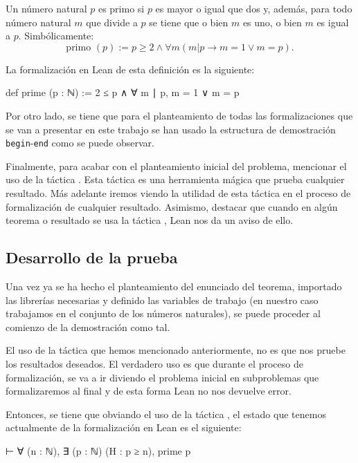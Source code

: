 \begin{definicion}
  Un número natural \(p\) es primo si \(p\) es mayor o igual que dos y,
  además, para todo número natural \(m\) que divide a \(p\) se tiene
  que o bien \(m\) es uno, o bien \(m\) es igual a \(p\).
  Simbólicamente:
  \begin{equation*}
    \text{primo }(p) := p ≥ 2 ∧ ∀ m (m | p → m = 1 ∨ m = p).
  \end{equation*}
\end{definicion}

La formalización en Lean de esta definición es la siguiente:
\begin{leancode}
def prime (p : ℕ) := 2 ≤ p ∧ ∀ m ∣ p, m = 1 ∨ m = p
\end{leancode}

Por otro lado, se tiene que para el planteamiento de todas las
formalizaciones que se van a presentar en este trabajo se han usado la
estructura de demostración \texttt{begin}-\texttt{end} como se puede
observar.

Finalmente, para acabar con el planteamiento inicial del problema,
mencionar el uso de la táctica . Esta táctica es
una herramienta mágica que prueba cualquier resultado. Más adelante
iremos viendo la utilidad de esta táctica en el proceso de formalización
de cualquier resultado.  Asimismo, destacar que cuando en algún teorema
o resultado se usa la táctica , Lean nos da un
aviso de ello.

\subsection{Desarrollo de la prueba}

Una vez ya se ha hecho el planteamiento del enunciado del teorema,
importado las librerías necesarias y definido las variables de trabajo
(en nuestro caso trabajamos en el conjunto de los números naturales), se
puede proceder al comienzo de la demostración como tal.

El uso de la táctica  que hemos mencionado
anteriormente, no es que nos pruebe los resultados deseados. El
verdadero uso es que durante el proceso de formalización, se va a ir
diviendo el problema inicial en subproblemas que formalizaremos al final
y de esta forma Lean no nos devuelve error.

Entonces, se tiene que obviando el uso de la táctica
, el estado que tenemos actualmente de la
formalización en Lean es el siguiente:
\begin{leancode}
⊢ ∀ (n : ℕ), ∃ (p : ℕ) (H : p ≥ n), prime p
\end{leancode}

